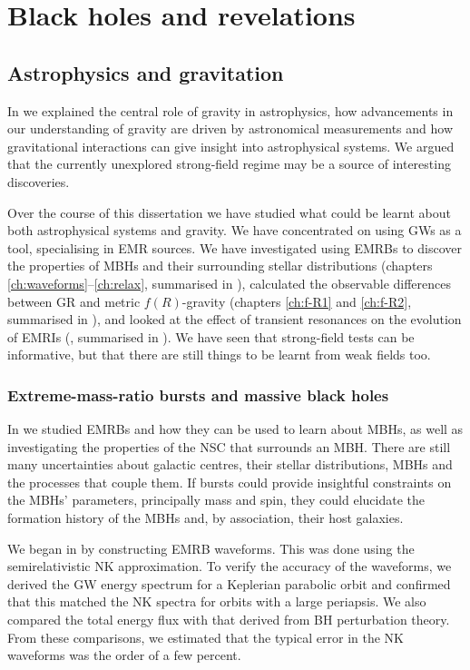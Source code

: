 \chapter{Black holes and revelations}\label{ch:All-good-things}

\section{Astrophysics and gravitation}

In  we explained the central role of gravity in astrophysics, how advancements in our understanding of gravity are driven by astronomical measurements and how gravitational interactions can give insight into astrophysical systems. We argued that the currently unexplored strong-field regime may be a source of interesting discoveries.

Over the course of this dissertation we have studied what could be learnt about both astrophysical systems and gravity. We have concentrated on using GWs as a tool, specialising in EMR sources. We have investigated using EMRBs to discover the properties of MBHs and their surrounding stellar distributions (chapters \ref{ch:waveforms}--\ref{ch:relax}, summarised in ), calculated the observable differences between GR and metric $f(R)$-gravity (chapters \ref{ch:f-R1} and \ref{ch:f-R2}, summarised in ), and looked at the effect of transient resonances on the evolution of EMRIs (, summarised in ). We have seen that strong-field tests can be informative, but that there are still things to be learnt from weak fields too.

\subsection{Extreme-mass-ratio bursts and massive black holes}\label{sec:Review-EMRBs}

In  we studied EMRBs and how they can be used to learn about MBHs, as well as investigating the properties of the NSC that surrounds an MBH. There are still many uncertainties about galactic centres, their stellar distributions, MBHs and the processes that couple them. If bursts could provide insightful constraints on the MBHs' parameters, principally mass and spin, they could elucidate the formation history of the MBHs and, by association, their host galaxies.

We began in  by constructing EMRB waveforms. This was done using the semirelativistic NK approximation. To verify the accuracy of the waveforms, we derived the GW energy spectrum for a Keplerian parabolic orbit and confirmed that this matched the NK spectra for orbits with a large periapsis. We also compared the total energy flux with that derived from BH perturbation theory. From these comparisons, we estimated that the typical error in the NK waveforms was the order of a few percent.

